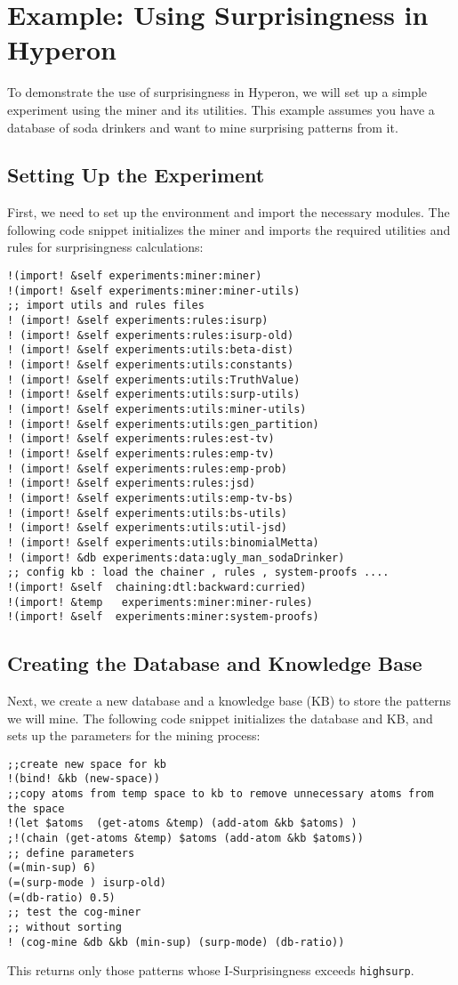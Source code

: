 \documentclass{article}
\begin{document}
\section{Example: Using Surprisingness in Hyperon} 
To demonstrate the use of surprisingness in Hyperon, we will set up a simple experiment using the miner and its utilities. This example assumes you have a database of soda drinkers
and want to mine surprising patterns from it.
\subsection{Setting Up the Experiment}
First, we need to set up the environment and import the necessary modules. The following code snippet initializes the miner and imports the required utilities and rules for surprisingness calculations:

\begin{verbatim}
!(import! &self experiments:miner:miner)
!(import! &self experiments:miner:miner-utils)
;; import utils and rules files 
! (import! &self experiments:rules:isurp)
! (import! &self experiments:rules:isurp-old)
! (import! &self experiments:utils:beta-dist)
! (import! &self experiments:utils:constants)
! (import! &self experiments:utils:TruthValue)
! (import! &self experiments:utils:surp-utils)
! (import! &self experiments:utils:miner-utils)
! (import! &self experiments:utils:gen_partition)
! (import! &self experiments:rules:est-tv)
! (import! &self experiments:rules:emp-tv)
! (import! &self experiments:rules:emp-prob)
! (import! &self experiments:rules:jsd)
! (import! &self experiments:utils:emp-tv-bs)
! (import! &self experiments:utils:bs-utils)
! (import! &self experiments:utils:util-jsd)
! (import! &self experiments:utils:binomialMetta)
! (import! &db experiments:data:ugly_man_sodaDrinker)
;; config kb : load the chainer , rules , system-proofs ....
!(import! &self  chaining:dtl:backward:curried)
!(import! &temp   experiments:miner:miner-rules)
!(import! &self  experiments:miner:system-proofs)
\end{verbatim}


\subsection{Creating the Database and Knowledge Base}
Next, we create a new database and a knowledge base (KB) to store the patterns we will mine. The following code snippet initializes the database and KB, and sets up the parameters for the mining process:

\begin{verbatim}
;;create new space for kb
!(bind! &kb (new-space))
;;copy atoms from temp space to kb to remove unnecessary atoms from the space
!(let $atoms  (get-atoms &temp) (add-atom &kb $atoms) )
;!(chain (get-atoms &temp) $atoms (add-atom &kb $atoms))
;; define parameters 
(=(min-sup) 6)
(=(surp-mode ) isurp-old)
(=(db-ratio) 0.5)
;; test the cog-miner
;; without sorting 
! (cog-mine &db &kb (min-sup) (surp-mode) (db-ratio))
\end{verbatim}





This returns only those patterns whose I-Surprisingness exceeds \texttt{highsurp}.
\end{document}
